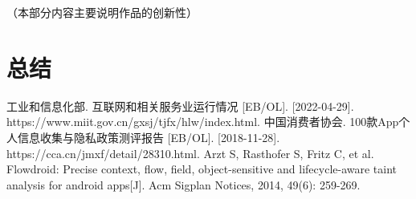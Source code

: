 \documentclass{cumcmthesis}
\numberwithin{equation}{section} %
\numberwithin{figure}{section} %
\numberwithin{table}{section} %
\begin{document}
（本部分内容主要说明作品的创新性）

\newpage

\section{总结}

\newpage

\begin{thebibliography}{9}%
	\setlength{\itemsep}{-1mm}  %
	
	工业和信息化部. 互联网和相关服务业运行情况 [EB/OL]. [2022-04-29]. https://www.miit.gov.cn/gxsj/tjfx/hlw/index.html.
    中国消费者协会. 100款App个人信息收集与隐私政策测评报告 [EB/OL]. [2018-11-28]. https://cca.cn/jmxf/detail/28310.html.
    Arzt S, Rasthofer S, Fritz C, et al. Flowdroid: Precise context, flow, field, object-sensitive and lifecycle-aware taint analysis for android apps[J]. Acm Sigplan Notices, 2014, 49(6): 259-269.
\end{thebibliography}
\end{document}
